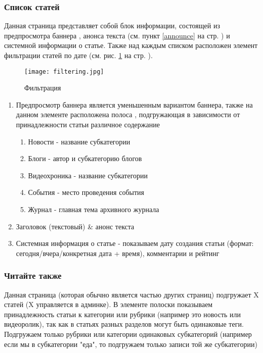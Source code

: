 \documentclass[DIV=calc, paper=a4, fontsize=11pt]{scrartcl} %
\begin{document}
\subsubsection{Список статей}
Данная страница представляет собой блок информации, состоящей из предпросмотра баннера , анонса текста (см. пункт \ref{announce} на стр. \pageref{announce}) и системной информации о статье. Также над каждым списком расположен элемент фильтрации статей по дате (см. рис. \ref{fig:filtering.jpg} на стр. \pageref{fig:filtering.jpg}).
            \begin{figure}[ht!]
            \centering
            \texttt{[image: filtering.jpg]}
            \caption{Фильтрация \label{fig:filtering.jpg}}
            \end{figure}
\begin{enumerate}
    \item Предпросмотр баннера является уменьшенным вариантом баннера, также на данном элементе расположена полоса \label{whiteline}, подгружающая в зависимости от принадлежности статьи различное содержание
    \begin{enumerate}
        \item Новости - название субкатегории
        \item Блоги - автор и субкатегорию блогов
        \item Видеохроника - название субкатегории
        \item События - место проведения события
        \item Журнал - главная тема архивного журнала
    \end{enumerate}
    \item Заголовок (текстовый) \& анонс текста
    \item Системная информация о статье - показываем дату создания статьи (формат: сегодня/вчера/конкретная дата + время), комментарии и рейтинг
\end{enumerate}

\subsubsection{Читайте также}
Данная страница (которая обычно является частью других страниц) подгружает X статей (X управляется в админке). В элементе полоски показываем принадлежность статьи к категории или рубрики (например это новость или видеоролик), так как в статьях разных разделов могут быть одинаковые теги. Подгружаем только рубрики или категории одинаковых субкатегорий (например если мы в субкатегории "еда", то подгружаем только записи той же субкатегории)
\end{document}
